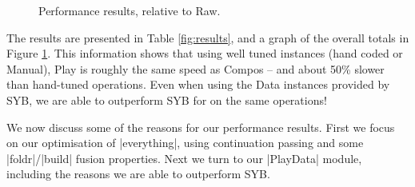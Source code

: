 \documentclass[preprint]{sigplanconf}
\begin{document}
\begin{figure}
\caption{Performance results, relative to Raw.}
\label{fig:graph}
\end{figure}


The results are presented in Table \ref{fig:results}, and a graph of the overall totals in Figure \ref{fig:graph}. This information shows that using well tuned instances (hand coded or Manual), Play is roughly the same speed as Compos -- and about 50\% slower than hand-tuned operations. Even when using the Data instances provided by SYB, we are able to outperform SYB for on the same operations!

We now discuss some of the reasons for our performance results. First we focus on our optimisation of |everything|, using continuation passing and some |foldr|/|build| fusion properties. Next we turn to our |PlayData| module, including the reasons we are able to outperform SYB.
\end{document}
